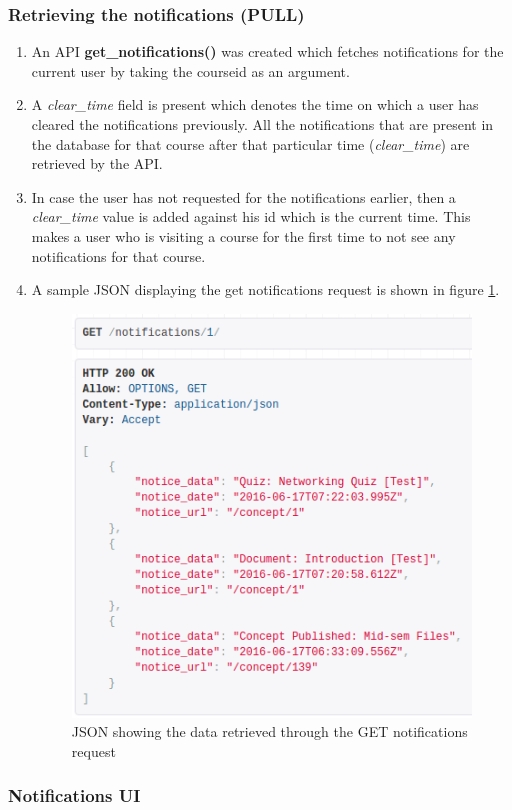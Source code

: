 \subsubsection{Retrieving the notifications (PULL)}

\begin{enumerate}
	\item An API \textbf{get\_notifications()} was created which fetches notifications for the current user by taking the courseid as an argument.
	\item A \textit{clear\_time} field is present which denotes the time on which a user has cleared the notifications previously. All the notifications that are present in the database for that course after that particular time (\textit{clear\_time}) are retrieved by the API.
	\item In case the user has not requested for the notifications earlier, then a \textit{clear\_time} value is added against his id which is the current time. This makes a user who is visiting a course for the first time to not see any notifications for that course.
	\item A sample JSON displaying the get notifications request is shown in figure \ref{fig:get_notifications}.
	\begin{figure}[h]
		\centering
		\includegraphics[width=0.7\linewidth]{./media/get_notifications}
		\caption{JSON showing the data retrieved through the GET notifications request}
		\label{fig:get_notifications}
	\end{figure}
\end{enumerate}

\subsubsection{Notifications UI}

